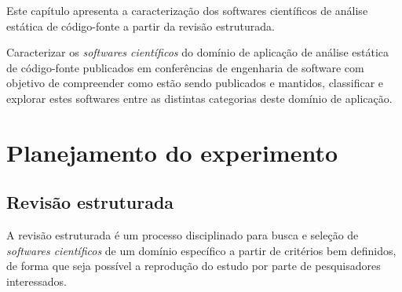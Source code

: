 {Este capítulo apresenta a caracterização dos softwares científicos de análise
estática de código-fonte a partir da revisão estruturada.}
\label{caracterizacao-ferramentas}

Caracterizar os {\it softwares científicos} do domínio de aplicação de análise
estática de código-fonte publicados em conferências de engenharia de software
com objetivo de compreender como estão sendo publicados e mantidos, classificar
e explorar estes softwares entre as distintas categorias deste domínio de
aplicação.


\section{Planejamento do experimento}

%
%

\subsection{Revisão estruturada}

A revisão estruturada é um processo disciplinado para busca e seleção de {\it
softwares científicos} de um domínio específico a partir de critérios bem
definidos, de forma que seja possível a reprodução do estudo por parte de
pesquisadores interessados.

